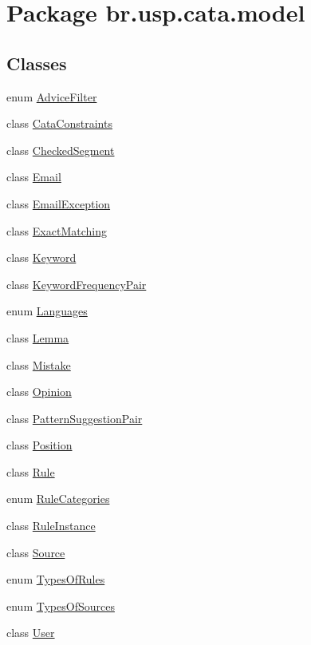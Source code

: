 \hypertarget{namespacebr_1_1usp_1_1cata_1_1model}{\section{Package br.\+usp.\+cata.\+model}
\label{namespacebr_1_1usp_1_1cata_1_1model}
}
\subsection*{Classes}
\begin{DoxyCompactItemize}
\item 
enum \hyperlink{enumbr_1_1usp_1_1cata_1_1model_1_1_advice_filter}{Advice\+Filter}
\item 
class \hyperlink{classbr_1_1usp_1_1cata_1_1model_1_1_cata_constraints}{Cata\+Constraints}
\item 
class \hyperlink{classbr_1_1usp_1_1cata_1_1model_1_1_checked_segment}{Checked\+Segment}
\item 
class \hyperlink{classbr_1_1usp_1_1cata_1_1model_1_1_email}{Email}
\item 
class \hyperlink{classbr_1_1usp_1_1cata_1_1model_1_1_email_exception}{Email\+Exception}
\item 
class \hyperlink{classbr_1_1usp_1_1cata_1_1model_1_1_exact_matching}{Exact\+Matching}
\item 
class \hyperlink{classbr_1_1usp_1_1cata_1_1model_1_1_keyword}{Keyword}
\item 
class \hyperlink{classbr_1_1usp_1_1cata_1_1model_1_1_keyword_frequency_pair}{Keyword\+Frequency\+Pair}
\item 
enum \hyperlink{enumbr_1_1usp_1_1cata_1_1model_1_1_languages}{Languages}
\item 
class \hyperlink{classbr_1_1usp_1_1cata_1_1model_1_1_lemma}{Lemma}
\item 
class \hyperlink{classbr_1_1usp_1_1cata_1_1model_1_1_mistake}{Mistake}
\item 
class \hyperlink{classbr_1_1usp_1_1cata_1_1model_1_1_opinion}{Opinion}
\item 
class \hyperlink{classbr_1_1usp_1_1cata_1_1model_1_1_pattern_suggestion_pair}{Pattern\+Suggestion\+Pair}
\item 
class \hyperlink{classbr_1_1usp_1_1cata_1_1model_1_1_position}{Position}
\item 
class \hyperlink{classbr_1_1usp_1_1cata_1_1model_1_1_rule}{Rule}
\item 
enum \hyperlink{enumbr_1_1usp_1_1cata_1_1model_1_1_rule_categories}{Rule\+Categories}
\item 
class \hyperlink{classbr_1_1usp_1_1cata_1_1model_1_1_rule_instance}{Rule\+Instance}
\item 
class \hyperlink{classbr_1_1usp_1_1cata_1_1model_1_1_source}{Source}
\item 
enum \hyperlink{enumbr_1_1usp_1_1cata_1_1model_1_1_types_of_rules}{Types\+Of\+Rules}
\item 
enum \hyperlink{enumbr_1_1usp_1_1cata_1_1model_1_1_types_of_sources}{Types\+Of\+Sources}
\item 
class \hyperlink{classbr_1_1usp_1_1cata_1_1model_1_1_user}{User}
\end{DoxyCompactItemize}
